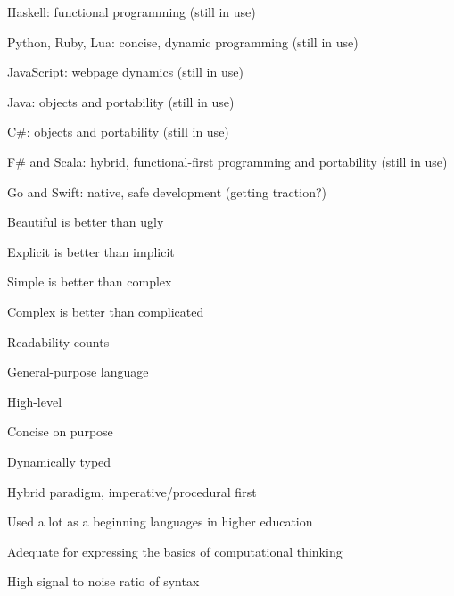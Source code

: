 \documentclass{beamer}
\begin{document}
\begin{slide}{
\item Haskell: functional programming (still in use)
\item Python, Ruby, Lua: concise, dynamic programming (still in use)
\item JavaScript: webpage dynamics (still in use)
\item Java: objects and portability (still in use)
}\end{slide}

\begin{slide}{
\item C\#: objects and portability (still in use)
\item F\# and Scala: hybrid, functional-first programming and portability (still in use)
\item Go and Swift: native, safe development (getting traction?)
}\end{slide}


\begin{slide}{
\item Beautiful is better than ugly
\item Explicit is better than implicit
\item Simple is better than complex
\item Complex is better than complicated
\item Readability counts
}\end{slide}

\begin{slide}{
\item General-purpose language
\item High-level
\item Concise on purpose
\item Dynamically typed
\item Hybrid paradigm, imperative/procedural first
}\end{slide}

\begin{slide}{
\item Used a lot as a beginning languages in higher education
\item Adequate for expressing the basics of computational thinking
\item High signal to noise ratio of syntax
}\end{slide}
\end{document}
